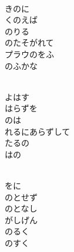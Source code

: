 \documentclass[10pt,b5j]{tarticle} %
\begin{document}
\begin{enumerate}
\begin{minipage}[c]{\blocksize}
    \end{minipage}
    \begin{minipage}[c]{\blocksize}
        
        \vspace{\linespace}
        \item~\\
        きのに\\
        くのえば\\
        のりる\\
        のたそがれて\\
        プラウのをふ\\
        のふかな
        
    \end{minipage}
    \begin{minipage}[c]{\blocksize}
        
        \vspace{\linespace}
        \item~\\
        よはす\\
        はらずを\\
        のは\\
        れるにあらずして\\
        たるの\\
        はの
        
    \end{minipage}
    \begin{minipage}[c]{\blocksize}
        
        \vspace{\linespace}
        \item~\\
        をに\\
        のとせず\\
        のとなし\\
        がしげん\\
        のるく\\
        のすく
    
    \end{minipage}
\end{enumerate} %
\end{document}
